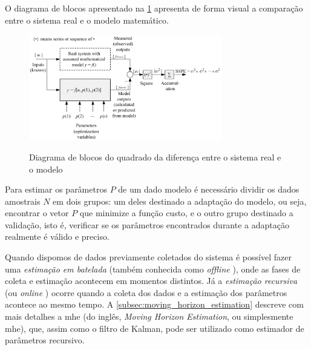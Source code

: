 O diagrama de blocos apresentado na \cref{fig:parameter_estimation} apresenta de forma
visual a comparação entre o sistema real e o modelo matemático.

\begin{figure}
	\caption{Diagrama de blocos do quadrado da diferença entre o sistema real e o modelo}
	\begin{center}
		\includegraphics[width=0.75\textwidth]{./5_images/fig_parameter_estimation.png} 
		\label{fig:parameter_estimation}
	\end{center}
	\centering
\end{figure}

Para estimar os parâmetros $P$ de um dado modelo é necessário dividir os dados amostrais
$N$ em dois grupos: um deles destinado a adaptação do modelo, ou seja, encontrar o vetor $P$
que minimize a função custo, e o outro grupo destinado a validação, isto é, verificar se os
parâmetros encontrados durante a adaptação realmente é válido e preciso.

Quando dispomos de dados previamente coletados do sistema é possível fazer uma \textit{estimação
em batelada} (também conhecida como \textit{offline} \cite{Bolognani2009}), onde as fases de coleta e
estimação acontecem em momentos distintos. Já a \textit{estimação recursiva} (ou \textit{online}
\cite{Stadler2011}) ocorre quando a coleta dos dados e a estimação dos parâmetros acontece ao mesmo tempo.
A \cref{subsec:moving_horizon_estimation} descreve com mais detalhes a
\acrlong{mhe} (do inglês, \textit{Moving Horizon Estimation}, ou simplesmente \acrshort{mhe}), que,
assim como o filtro de Kalman, pode ser utilizado como estimador de parâmetros recursivo.

